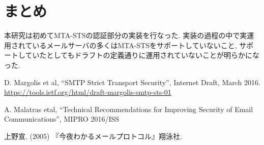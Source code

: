 \documentclass[a4j, 10pt, uplatex]{jsarticle}
\begin{document}
\section{まとめ}

本研究は初めてMTA-STSの認証部分の実装を行なった. 実装の過程の中で実運用されているメールサーバの多くはMTA-STSをサポートしていないこと, サポートしていたとしてもドラフトの定義通りに運用されていないことが明らかになった.



\begin{thebibliography}{9}
D. Margolis et al,  “SMTP Strict Transport Security”,  Internet Draft,  March 2016.\\
\url{https://tools.ietf.org/html/draft-margolis-smtp-sts-01}

A. Malatras etal,  “Technical Recommendations for Improving Security of Email Communications”,  MIPRO 2016/ISS

上野宣. (2005) 『今夜わかるメールプロトコル』翔泳社.

\end{thebibliography}
\end{document}
